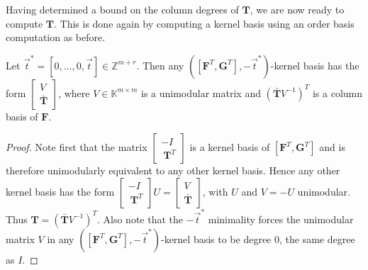 Having determined a bound on the column degrees of $\mathbf{T}$,
we are now ready to compute $\mathbf{T}$. This is done again by computing
a kernel basis using an order basis computation as before. 
\begin{lem}
Let $\vec{t}^{*}=\left[0,\dots,0,\vec{t}\right]\in\mathbb{Z}^{m+r}$.
Then any $\left(\left[\mathbf{F}^{T},\mathbf{G}^{T}\right],-\vec{t}^{*}\right)$-kernel
basis has the form $\begin{bmatrix}V\\
\bar{\mathbf{T}}
\end{bmatrix}$, where $V\in\mathbb{K}^{m\times m}$ is a unimodular matrix and $\left(\bar{\mathbf{T}}V^{-1}\right)^{T}$
is a column basis of $\mathbf{F}$. \end{lem}
\begin{proof}
Note first that the matrix $\begin{bmatrix}-I~\\
~ \mathbf{T}^{T}
\end{bmatrix}$ is a kernel basis of $\left[\mathbf{F}^{T},\mathbf{G}^{T}\right]$
and is therefore unimodularly equivalent to any other kernel basis.
Hence any other kernel basis has the form $\begin{bmatrix}-I~\\
~\mathbf{T}^{T}
\end{bmatrix}U=\begin{bmatrix}V\\
\bar{\mathbf{T}}
\end{bmatrix}$, with $U$ and $V=-U$ unimodular. Thus $\mathbf{T}=\left(\bar{\mathbf{T}}V^{-1}\right)^{T}$.
Also note that the $-\vec{t}^{*}$ minimality forces the unimodular
matrix $V$ in any $\left(\left[\mathbf{F}^{T},\mathbf{G}^{T}\right],-\vec{t}^{*}\right)$-kernel
basis to be degree 0, the same degree as $I$. \end{proof}

